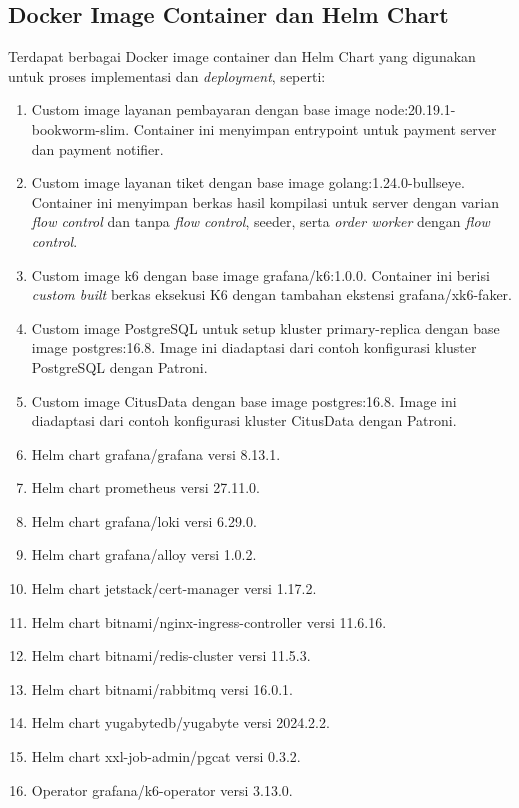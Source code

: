 \subsection{Docker Image Container dan Helm Chart}

Terdapat berbagai Docker image container dan Helm Chart yang digunakan untuk proses implementasi dan \textit{deployment}, seperti:

\begin{enumerate}
    \item Custom image layanan pembayaran dengan base image node:20.19.1-bookworm-slim. Container ini menyimpan entrypoint untuk payment server dan payment notifier.
    \item Custom image layanan tiket dengan base image golang:1.24.0-bullseye. Container ini menyimpan berkas hasil kompilasi untuk server dengan varian \textit{flow control} dan tanpa \textit{flow control}, seeder, serta \textit{order worker} dengan \textit{flow control}.
    \item Custom image k6 dengan base image grafana/k6:1.0.0. Container ini berisi \textit{custom built} berkas eksekusi K6 dengan tambahan ekstensi grafana/xk6-faker.
    \item Custom image PostgreSQL untuk setup kluster primary-replica dengan base image postgres:16.8. Image ini diadaptasi dari contoh konfigurasi kluster PostgreSQL dengan Patroni.
    \item Custom image CitusData dengan base image postgres:16.8. Image ini diadaptasi dari contoh konfigurasi kluster CitusData dengan Patroni.
    \item Helm chart grafana/grafana versi 8.13.1.
    \item Helm chart prometheus versi 27.11.0.
    \item Helm chart grafana/loki versi 6.29.0.
    \item Helm chart grafana/alloy versi 1.0.2.
    \item Helm chart jetstack/cert-manager versi 1.17.2.
    \item Helm chart bitnami/nginx-ingress-controller versi 11.6.16.
    \item Helm chart bitnami/redis-cluster versi 11.5.3.
    \item Helm chart bitnami/rabbitmq versi 16.0.1.
    \item Helm chart yugabytedb/yugabyte versi 2024.2.2.
    \item Helm chart xxl-job-admin/pgcat versi 0.3.2.
    \item Operator grafana/k6-operator versi 3.13.0.
\end{enumerate}